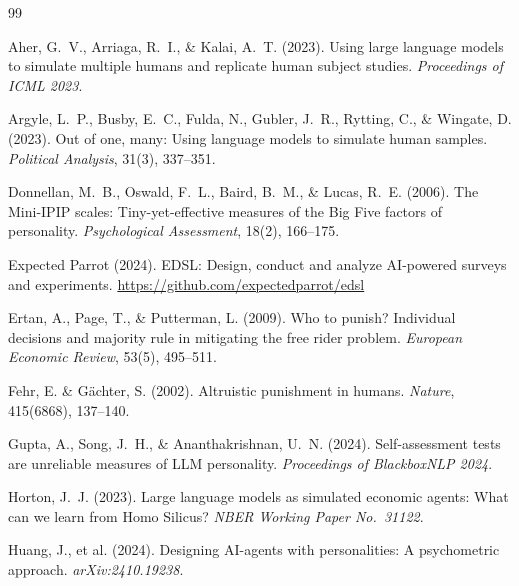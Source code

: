 \documentclass[12pt, a4paper]{article}
\begin{document}

\begin{thebibliography}{99}

Aher, G.~V., Arriaga, R.~I., \& Kalai, A.~T. (2023).
\newblock Using large language models to simulate multiple humans and replicate human subject studies.
\newblock \emph{Proceedings of ICML 2023}.

Argyle, L.~P., Busby, E.~C., Fulda, N., Gubler, J.~R., Rytting, C., \& Wingate, D. (2023).
\newblock Out of one, many: Using language models to simulate human samples.
\newblock \emph{Political Analysis}, 31(3), 337--351.

Donnellan, M.~B., Oswald, F.~L., Baird, B.~M., \& Lucas, R.~E. (2006).
\newblock The Mini-IPIP scales: Tiny-yet-effective measures of the Big Five factors of personality.
\newblock \emph{Psychological Assessment}, 18(2), 166--175.

Expected Parrot (2024).
\newblock EDSL: Design, conduct and analyze AI-powered surveys and experiments.
\newblock \url{https://github.com/expectedparrot/edsl}

Ertan, A., Page, T., \& Putterman, L. (2009).
\newblock Who to punish? Individual decisions and majority rule in mitigating the free rider problem.
\newblock \emph{European Economic Review}, 53(5), 495--511.

Fehr, E. \& G{\"a}chter, S. (2002).
\newblock Altruistic punishment in humans.
\newblock \emph{Nature}, 415(6868), 137--140.

Gupta, A., Song, J.~H., \& Ananthakrishnan, U.~N. (2024).
\newblock Self-assessment tests are unreliable measures of LLM personality.
\newblock \emph{Proceedings of BlackboxNLP 2024}.

Horton, J.~J. (2023).
\newblock Large language models as simulated economic agents: What can we learn from Homo Silicus?
\newblock \emph{NBER Working Paper No.\ 31122}.

Huang, J., et al. (2024).
\newblock Designing AI-agents with personalities: A psychometric approach.
\newblock \emph{arXiv:2410.19238}.


\end{thebibliography}
\end{document}
